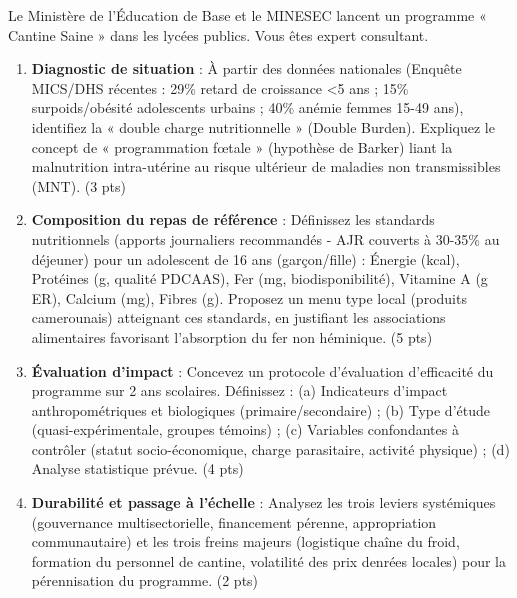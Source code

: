 \documentclass[11pt]{article}
\begin{document}
\begin{exercice}
Le Ministère de l'Éducation de Base et le MINESEC lancent un programme « Cantine Saine » dans les lycées publics. Vous êtes expert consultant.

\begin{enumerate}
    \item \textbf{Diagnostic de situation} : À partir des données nationales (Enquête MICS/DHS récentes : 29\% retard de croissance <5 ans ; 15\% surpoids/obésité adolescents urbains ; 40\% anémie femmes 15-49 ans), identifiez la « double charge nutritionnelle » (Double Burden). Expliquez le concept de « programmation fœtale » (hypothèse de Barker) liant la malnutrition intra-utérine au risque ultérieur de maladies non transmissibles (MNT). \hfill (3 pts)
    \item \textbf{Composition du repas de référence} : Définissez les standards nutritionnels (apports journaliers recommandés - AJR couverts à 30-35\% au déjeuner) pour un adolescent de 16 ans (garçon/fille) : Énergie (kcal), Protéines (g, qualité PDCAAS), Fer (mg, biodisponibilité), Vitamine A (\mu g ER), Calcium (mg), Fibres (g). Proposez un menu type local (produits camerounais) atteignant ces standards, en justifiant les associations alimentaires favorisant l'absorption du fer non héminique. \hfill (5 pts)
    \item \textbf{Évaluation d'impact} : Concevez un protocole d'évaluation d'efficacité du programme sur 2 ans scolaires. Définissez : (a) Indicateurs d'impact anthropométriques et biologiques (primaire/secondaire) ; (b) Type d'étude (quasi-expérimentale, groupes témoins) ; (c) Variables confondantes à contrôler (statut socio-économique, charge parasitaire, activité physique) ; (d) Analyse statistique prévue. \hfill (4 pts)
    \item \textbf{Durabilité et passage à l'échelle} : Analysez les trois leviers systémiques (gouvernance multisectorielle, financement pérenne, appropriation communautaire) et les trois freins majeurs (logistique chaîne du froid, formation du personnel de cantine, volatilité des prix denrées locales) pour la pérennisation du programme. \hfill (2 pts)
\end{enumerate}
\end{exercice}
\end{document}
